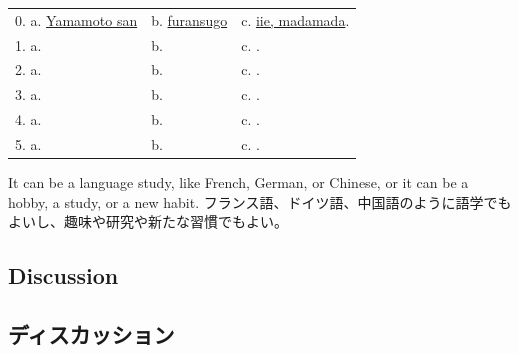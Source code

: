 \documentclass[uplatex,dvipdfmx,b5paper,english,10pt]{jsbook}
\begin{document}
\begin{tabular}[t]{lll}
 0. a. \underline{ Yamamoto san\hspace{0.7zw}}
 &  b. \underline{ furansugo\hspace{3.0zw}}
 &  c. \underline{ iie, madamada\hspace{4.8zw}}.\\
 1. a. \underline{\hspace{8zw}}& b. \underline{\hspace{8zw}} & c. \underline{\hspace{12zw}}.\\
 2. a. \underline{\hspace{8zw}}& b. \underline{\hspace{8zw}} & c. \underline{\hspace{12zw}}.\\
 3. a. \underline{\hspace{8zw}}& b. \underline{\hspace{8zw}} & c. \underline{\hspace{12zw}}.\\
 4. a. \underline{\hspace{8zw}}& b. \underline{\hspace{8zw}} & c. \underline{\hspace{12zw}}.\\
 5. a. \underline{\hspace{8zw}}& b. \underline{\hspace{8zw}} & c. \underline{\hspace{12zw}}.\\
\end{tabular}

\begin{toianswer}
\ifEnglish
It can be a language study, like French, German, or Chinese, or it can be a hobby, a study, or a new habit.
\else
フランス語、ドイツ語、中国語のように語学でもよいし、趣味や研究や新たな習慣でもよい。
\fi
\end{toianswer}


\ifEnglish
\subsection{Discussion}
\else
\subsection{ディスカッション}
\fi
\end{document}
